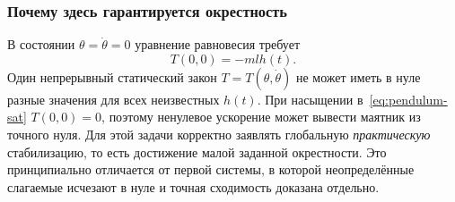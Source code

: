 \subsubsection{Почему здесь гарантируется окрестность}

В состоянии $\theta=\dot\theta=0$ уравнение равновесия требует
\[
 T(0,0)=-mlh(t).
\]
Один непрерывный статический закон $T=T(\theta,\dot\theta)$ не может иметь
в нуле разные значения для всех неизвестных $h(t)$. При насыщении
в~\eqref{eq:pendulum-sat} $T(0,0)=0$, поэтому ненулевое ускорение
может вывести маятник из точного нуля. Для этой задачи корректно заявлять
глобальную \emph{практическую} стабилизацию, то есть достижение малой
заданной окрестности. Это принципиально отличается от первой системы,
в которой неопределённые слагаемые исчезают в нуле и точная сходимость
доказана отдельно.
